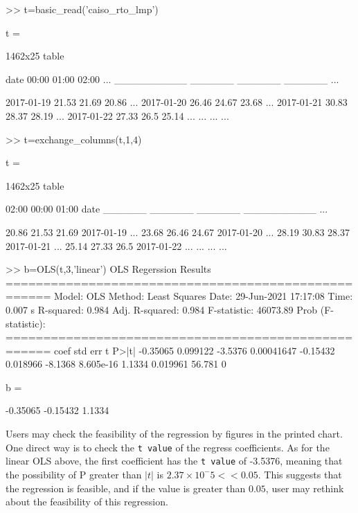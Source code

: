 \documentclass[10pt]{article}
\numberwithin{equation}{section}
\numberwithin{table}{section}
\numberwithin{figure}{section}
\begin{document}
\begin{Command}
>> t=basic_read('caiso_rto_lmp')

t =

  1462x25 table

       date       00:00     01:00     02:00             ...
    __________    ______    ______    ______            ...

    2017-01-19     21.53     21.69     20.86            ...
    2017-01-20     26.46     24.67     23.68            ...
    2017-01-21     30.83     28.37     28.19            ...
    2017-01-22     27.33     26.5      25.14            ...
                ...                  ...                ...

>> t=exchange_columns(t,1,4)

t =

  1462x25 table

    02:00     00:00     01:00        date    
    ______    ______    ______    __________            ...

    20.86     21.53     21.69     2017-01-19            ...
    23.68     26.46     24.67     2017-01-20            ...
    28.19     30.83     28.37     2017-01-21            ...
    25.14     27.33     26.5      2017-01-22            ...
            ...                  ...                    ...
            
>> b=OLS(t,3,'linear')
               OLS Regerssion Results 
====================================================
           Model:                      OLS
           Method:           Least Squares
           Date:      29-Jun-2021 17:17:08
           Time:                   0.007 s
           R-squared:                0.984
           Adj. R-squared:           0.984
           F-statistic:              46073.89
           Prob (F-statistic):     
====================================================
        coef        std err        t         P>|t|      
     -0.35065     0.099122      -3.5376   0.00041647
     -0.15432     0.018966      -8.1368    8.605e-16
       1.1334     0.019961       56.781            0


b =

     -0.35065
     -0.15432
       1.1334
\end{Command}

Users may check the feasibility of the regression by figures in the printed chart. One direct way is to check the \verb!t value! of the regress coefficients. As for the linear OLS above, the first coefficient has the \verb!t value! of -3.5376, meaning that the possibility of P greater than $|t|$ is $2.37 \times 10^-5 << 0.05$. This suggests that the regression is feasible, and if the value is greater than $0.05$, user may rethink about the feasibility of this regression.
\end{document}

